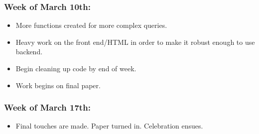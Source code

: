 \documentclass{article}
\begin{document}
\subsubsection*{Week of March 10th:}
\begin{itemize}
\item More functions created for more complex queries.
\item Heavy work on the front end/HTML in order to make it robust enough to use backend.
\item Begin cleaning up code by end of week.
\item Work begins on final paper.
\end{itemize}

\subsubsection*{Week of March 17th:}
\begin{itemize}
\item Final touches are made.  Paper turned in.  Celebration ensues.
\end{itemize}
\end{document}
